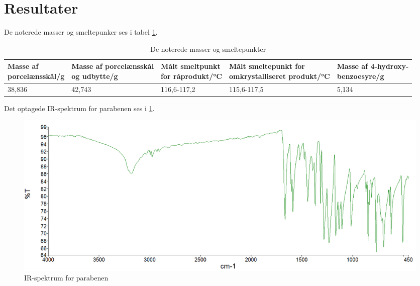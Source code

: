 \documentclass{report}
\begin{document}
\section*{Resultater}
De noterede masser og smeltepunker ses i tabel \ref{tab:masse}.
\begin{table}[H]
  \centering
  \begin{tabular}{@{}lllll@{}}
  \toprule
    \makecell{Masse af \\porcelænsskål/g} & \makecell{Masse af porcelænsskål \\og udbytte/g} & \makecell{Målt smeltpunkt \\for råprodukt/\unit{\celsius}} & \makecell{Målt smeltepunkt for \\omkrystalliseret produkt/\unit{\celsius}}&\makecell{Masse af 4-hydroxy-\\benzoesyre/g} \\
  \midrule
    38,836 & 42,743 & 116,6-117,2 & 115,6-117,5&5,134\\
  \bottomrule
  \end{tabular}
  \caption{De noterede masser og smeltepunkter}
  \label{tab:masse}
\end{table}
Det optagede IR-spektrum for parabenen ses i \cref{fig:IR}.
\begin{figure}[H]
\begin{center}
  \includegraphics[width=\textwidth]{IR.png}
\end{center}
\caption{IR-spektrum for parabenen}
\label{fig:IR}
\end{figure}
\end{document}
